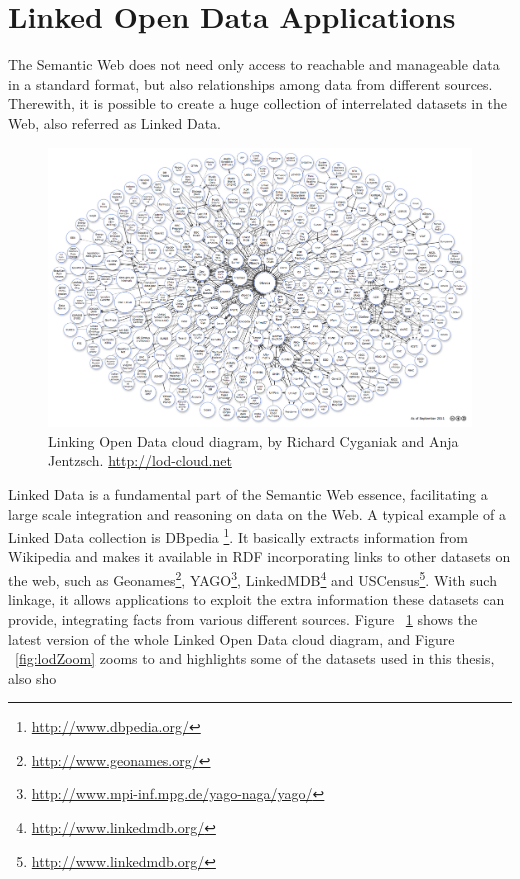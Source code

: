 \section{Linked Open Data Applications}
\label{sec:rw-lod}

The Semantic Web does not need only access to reachable and manageable data in a standard format, but also
relationships among data from different sources. Therewith, it is possible to create a huge collection of interrelated
datasets in the Web, also referred as Linked Data.

\begin{figure}[h!]
\label{fig:lod}
\begin{center}
  \includegraphics[width=1\linewidth]{./Figures/lod-datasets_2011-09-19.png}
\end{center}
\caption{Linking Open Data cloud diagram, by Richard Cyganiak and Anja Jentzsch. \url{http://lod-cloud.net}}
\end{figure}

Linked Data is a fundamental part of the Semantic Web essence, facilitating a large scale integration and reasoning
on data on the Web. A typical example of a Linked Data collection is DBpedia
{\footnote{\url{http://www.dbpedia.org/}}}. It basically extracts information from Wikipedia and
makes it available in RDF incorporating links to other datasets on the web, such as 
Geonames\footnote{\url{http://www.geonames.org/}},
YAGO\footnote{\url{http://www.mpi-inf.mpg.de/yago-naga/yago/}}, 
LinkedMDB\footnote{\url{http://www.linkedmdb.org/}} and 
USCensus\footnote{\url{http://www.linkedmdb.org/}}. 
With such linkage, it allows
applications to exploit the extra information these datasets can provide, integrating facts from various different
sources. Figure ~\ref{fig:lod} shows the latest version of the whole Linked Open Data cloud
diagram, and Figure ~\ref{fig:lodZoom} zooms to and highlights some of the datasets used in this thesis, also sho

